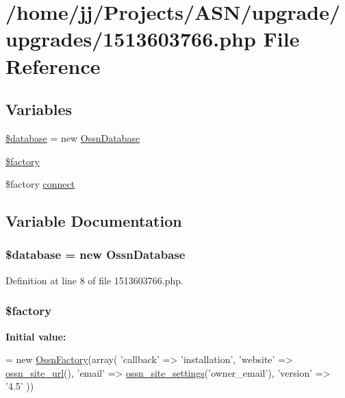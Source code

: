 \hypertarget{1513603766_8php}{}\section{/home/jj/\+Projects/\+A\+S\+N/upgrade/upgrades/1513603766.php File Reference}
\label{1513603766_8php}
\subsection*{Variables}
\begin{DoxyCompactItemize}
\item 
\hyperlink{1513603766_8php_a7691c0162d89de0b6ba47edcd8ba8878}{\$database} = new \hyperlink{class_ossn_database}{Ossn\+Database}
\item 
\hyperlink{1513603766_8php_a099b374dc664ee043fffcd6ea05e3e70}{\$factory}
\item 
\$factory \hyperlink{1513603766_8php_a3fdbedd7713e458f25fcf7dc1f562a3d}{connect}
\end{DoxyCompactItemize}


\subsection{Variable Documentation}
\subsubsection[{\texorpdfstring{\$database}{$database}}]{\setlength{\rightskip}{0pt plus 5cm}\${\bf database} = new {\bf Ossn\+Database}}\hypertarget{1513603766_8php_a7691c0162d89de0b6ba47edcd8ba8878}{}\label{1513603766_8php_a7691c0162d89de0b6ba47edcd8ba8878}


Definition at line 8 of file 1513603766.\+php.

\subsubsection[{\texorpdfstring{\$factory}{$factory}}]{\setlength{\rightskip}{0pt plus 5cm}\$factory}\hypertarget{1513603766_8php_a099b374dc664ee043fffcd6ea05e3e70}{}\label{1513603766_8php_a099b374dc664ee043fffcd6ea05e3e70}
{\bfseries Initial value\+:}
\begin{DoxyCode}
= \textcolor{keyword}{new} \hyperlink{class_ossn_factory}{OssnFactory}(array(
        \textcolor{stringliteral}{'callback'} => \textcolor{stringliteral}{'installation'},
        \textcolor{stringliteral}{'website'} => \hyperlink{ossn_8lib_8system_8php_a2f12f9244f99eccd1225afb76ef2ab65}{ossn\_site\_url}(),
        \textcolor{stringliteral}{'email'} => \hyperlink{ossn_8lib_8system_8php_a610e2045b8a86c09f777b4d82e24e34c}{ossn\_site\_settings}(\textcolor{stringliteral}{'owner\_email'}),
        \textcolor{stringliteral}{'version'} => \textcolor{stringliteral}{'4.5'}
))
\end{DoxyCode}


